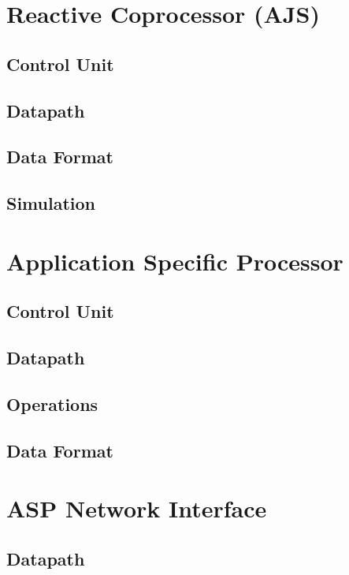 \documentclass[journal, onecolumn]{IEEEtran}
\begin{document}
	\section{Reactive Coprocessor (AJS)}
		
		\subsection{Control Unit}
		
		\subsection{Datapath}
		
		\subsection{Data Format}
		
		\subsection{Simulation}
	
	
	\section{Application Specific Processor}

		\subsection{Control Unit}

		\subsection{Datapath}

		\subsection{Operations}
		
		\subsection{Data Format}

	\section{ASP Network Interface}

		\subsection{Datapath}
		
\end{document}
